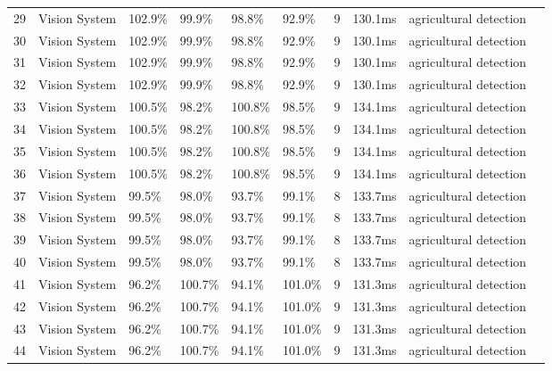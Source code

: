 \begin{table*}[htbp]
\begin{tabular}{p{}p{}p{}p{}p{}p{}p{}p{}p{}p{}}
 29 & Vision System & 102.9\% & 99.9\% & 98.8\% & 92.9\% & 9 & 130.1ms & agricultural detection & \cite{chen2021design} \\
 30 & Vision System & 102.9\% & 99.9\% & 98.8\% & 92.9\% & 9 & 130.1ms & agricultural detection & \cite{li2021reconfigurable} \\
 31 & Vision System & 102.9\% & 99.9\% & 98.8\% & 92.9\% & 9 & 130.1ms & agricultural detection & \cite{wang2021design} \\
 32 & Vision System & 102.9\% & 99.9\% & 98.8\% & 92.9\% & 9 & 130.1ms & agricultural detection & \cite{zhang2021reconfigurable} \\
 33 & Vision System & 100.5\% & 98.2\% & 100.8\% & 98.5\% & 9 & 134.1ms & agricultural detection & \cite{chen2022design} \\
 34 & Vision System & 100.5\% & 98.2\% & 100.8\% & 98.5\% & 9 & 134.1ms & agricultural detection & \cite{li2022reconfigurable} \\
 35 & Vision System & 100.5\% & 98.2\% & 100.8\% & 98.5\% & 9 & 134.1ms & agricultural detection & \cite{wang2022design} \\
 36 & Vision System & 100.5\% & 98.2\% & 100.8\% & 98.5\% & 9 & 134.1ms & agricultural detection & \cite{zhang2022reconfigurable} \\
 37 & Vision System & 99.5\% & 98.0\% & 93.7\% & 99.1\% & 8 & 133.7ms & agricultural detection & \cite{chen2023design} \\
 38 & Vision System & 99.5\% & 98.0\% & 93.7\% & 99.1\% & 8 & 133.7ms & agricultural detection & \cite{li2023reconfigurable} \\
 39 & Vision System & 99.5\% & 98.0\% & 93.7\% & 99.1\% & 8 & 133.7ms & agricultural detection & \cite{wang2023design} \\
 40 & Vision System & 99.5\% & 98.0\% & 93.7\% & 99.1\% & 8 & 133.7ms & agricultural detection & \cite{zhang2023reconfigurable} \\
 41 & Vision System & 96.2\% & 100.7\% & 94.1\% & 101.0\% & 9 & 131.3ms & agricultural detection & \cite{chen2024design} \\
 42 & Vision System & 96.2\% & 100.7\% & 94.1\% & 101.0\% & 9 & 131.3ms & agricultural detection & \cite{li2024reconfigurable} \\
 43 & Vision System & 96.2\% & 100.7\% & 94.1\% & 101.0\% & 9 & 131.3ms & agricultural detection & \cite{wang2024design} \\
 44 & Vision System & 96.2\% & 100.7\% & 94.1\% & 101.0\% & 9 & 131.3ms & agricultural detection & \cite{zhang2024reconfigurable} \\

\end{tabular}
\end{table*}
